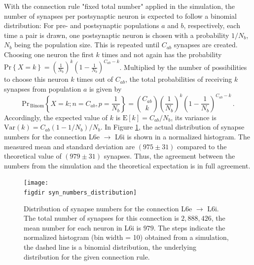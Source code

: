 With the connection rule "fixed total number" applied in the simulation, 
the number of synapses per postsynaptic neuron is expected to follow a binomial distribution:
For pre- and postsynaptic populations $a$ and $b$, respectively, 
each time a pair is drawn, one postsynaptic neuron is chosen with a probability 
$1 / N_b$, $N_b$ being the population size. This is repeated until $C_{ab}$ synapses are
created. 
Choosing one neuron the first $k$ times and not again has the probability 
$\text{Pr}\left\{X = k\right\} = 
\left( \frac{1}{N_b} \right)^{k} 
\left( 1 - \frac{1}{N_b} \right)^{C_{ab} - k}$.
Multiplied by the number of possibilities to choose this neuron $k$ times out of 
$C_{ab}$, the total probabilities of receiving $k$ synapses from population $a$ is
given by
\begin{equation}
    \text{Pr}_{\,\text{Binom}}\left\{X = k; n=C_{ab}, p=\frac{1}{N_b}\right\} = 
        {C_{ab}\choose{k}} 
        \left( \frac{1}{N_b} \right)^{k} 
        \left( 1 - \frac{1}{N_b} \right)^{C_{ab} - k} \,.
    \label{eq:binomial}
\end{equation}
Accordingly, the expected value of $k$ is $\text{E}[k] = C_{ab} / N_b$, its variance is 
$\text{Var}(k) = C_{ab} (1 - 1/N_b) / N_b$. 
In Figure \ref{fig:syn_numbers_distribution}, the actual distribution of synapse numbers 
for the connection L6e $\to$ L6i is shown in a normalized histogram. 
The measured mean and standard deviation are $(975 \pm 31)$ compared to the theoretical 
value of $(979 \pm 31)$ synapses. 
Thus, the agreement between the numbers from the simulation and the theoretical expectation is
in full agreement. 
\begin{figure}[tb]
    \centering
    \texttt{[image: \\figdir syn\_numbers\_distribution]}
    \caption[Distribution of synapse numbers]{
        Distribution of synapse numbers for the connection L6e $\to$ L6i.
        The total number of synapses for this connection is $2,888,426$, 
        the mean number for each neuron in L6i is $979$.
        The steps indicate the normalized histogram (bin width = 10) obtained 
        from a simulation, the dashed line is a binomial distribution, the 
        underlying distribution for the given connection rule. 
    }
    \label{fig:syn_numbers_distribution}
\end{figure}

